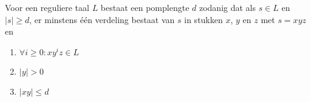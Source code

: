 Voor een reguliere taal $L$ bestaat een pomplengte $d$ zodanig dat als $s \in L$ en $|s| \geq d$, er minstens \'e\'en verdeling bestaat van $s$ in stukken $x$, $y$ en $z$ met $s = xyz$ en
  \begin{enumerate}
  \item $\forall i \geq 0: xy^iz \in L$
  \item $|y| > 0$
  \item $|xy| \leq d$
  \end{enumerate}